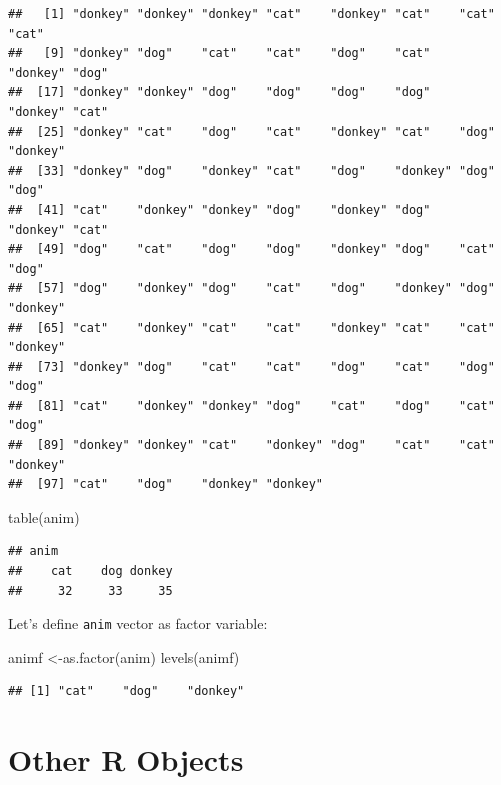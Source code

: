 \documentclass[
]{book}
\newenvironment{Shaded}{\begin{snugshade}}{\end{snugshade}}
\newcommand{\FunctionTok}[1]{\textcolor[rgb]{0.00,0.00,0.00}{#1}}
\newcommand{\NormalTok}[1]{#1}
\newcommand{\OtherTok}[1]{\textcolor[rgb]{0.56,0.35,0.01}{#1}}
\theoremstyle{definition}
\theoremstyle{definition}
\theoremstyle{definition}
\theoremstyle{definition}
\theoremstyle{remark}
\begin{document}
\begin{verbatim}
##   [1] "donkey" "donkey" "donkey" "cat"    "donkey" "cat"    "cat"    "cat"   
##   [9] "donkey" "dog"    "cat"    "cat"    "dog"    "cat"    "donkey" "dog"   
##  [17] "donkey" "donkey" "dog"    "dog"    "dog"    "dog"    "donkey" "cat"   
##  [25] "donkey" "cat"    "dog"    "cat"    "donkey" "cat"    "dog"    "donkey"
##  [33] "donkey" "dog"    "donkey" "cat"    "dog"    "donkey" "dog"    "dog"   
##  [41] "cat"    "donkey" "donkey" "dog"    "donkey" "dog"    "donkey" "cat"   
##  [49] "dog"    "cat"    "dog"    "dog"    "donkey" "dog"    "cat"    "dog"   
##  [57] "dog"    "donkey" "dog"    "cat"    "dog"    "donkey" "dog"    "donkey"
##  [65] "cat"    "donkey" "cat"    "cat"    "donkey" "cat"    "cat"    "donkey"
##  [73] "donkey" "dog"    "cat"    "cat"    "dog"    "cat"    "dog"    "dog"   
##  [81] "cat"    "donkey" "donkey" "dog"    "cat"    "dog"    "cat"    "dog"   
##  [89] "donkey" "donkey" "cat"    "donkey" "dog"    "cat"    "cat"    "donkey"
##  [97] "cat"    "dog"    "donkey" "donkey"
\end{verbatim}

\begin{Shaded}
\begin{Highlighting}[]
\FunctionTok{table}\NormalTok{(anim)}
\end{Highlighting}
\end{Shaded}

\begin{verbatim}
## anim
##    cat    dog donkey 
##     32     33     35
\end{verbatim}

Let's define \texttt{anim} vector as factor variable:

\begin{Shaded}
\begin{Highlighting}[]
\NormalTok{animf }\OtherTok{\textless{}{-}}\FunctionTok{as.factor}\NormalTok{(anim)}
\FunctionTok{levels}\NormalTok{(animf)}
\end{Highlighting}
\end{Shaded}

\begin{verbatim}
## [1] "cat"    "dog"    "donkey"
\end{verbatim}

\hypertarget{other-r-objects}{%
\chapter{Other R Objects}\label{other-r-objects}}
\end{document}
